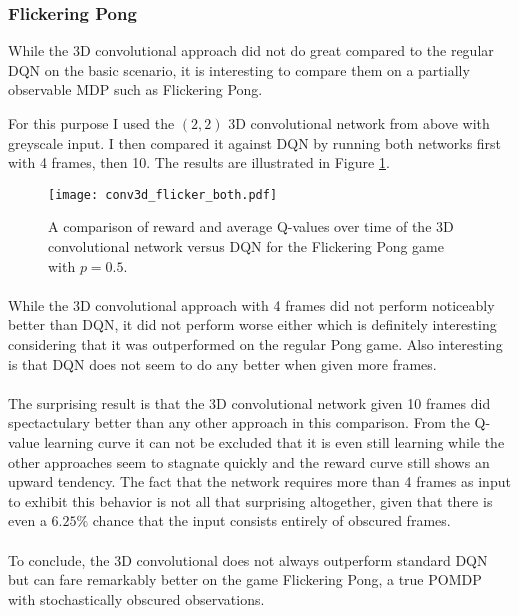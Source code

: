 \subsubsection{Flickering Pong}
While the 3D convolutional approach
did not do great compared to the regular DQN
on the basic scenario,
it is interesting to compare them
on a partially observable MDP
such as Flickering Pong.

For this purpose I used the $(2,2)$ 3D convolutional network from above
with greyscale input.
I then compared it against DQN by running both
networks first with 4 frames, then 10.
The results are illustrated in Figure \ref{fig:conv3d_flicker_both}.

\begin{figure}[htpb]
  \centering
  \texttt{[image: conv3d\_flicker\_both.pdf]}
  \caption{
    A comparison
    of reward and average Q-values over time
    of the 3D convolutional network versus DQN
    for the Flickering Pong game with $p=0.5$.
  }
  \label{fig:conv3d_flicker_both}
\end{figure}

\paragraph{}
While the 3D convolutional approach with 4 frames did not perform noticeably
better than DQN,
it did not perform worse either
which is definitely interesting considering
that it was outperformed on the regular Pong game.
Also interesting is that DQN does not seem to do any better when given more frames.

\paragraph{}
The surprising result is that the 3D convolutional network given 10 frames
did spectactulary better than any other approach in this comparison.
From the Q-value learning curve it can not be excluded that it is
even still learning while the other approaches seem to stagnate quickly
and the reward curve still shows an upward tendency.
The fact that the network requires more than 4 frames as input
to exhibit this behavior is not all that surprising altogether,
given that there is even a $6.25\%$ chance
that the input consists entirely of obscured frames.

\paragraph{}
To conclude,
the 3D convolutional does not always outperform standard DQN
but can fare remarkably better
on the game Flickering Pong,
a true POMDP with stochastically obscured observations.



